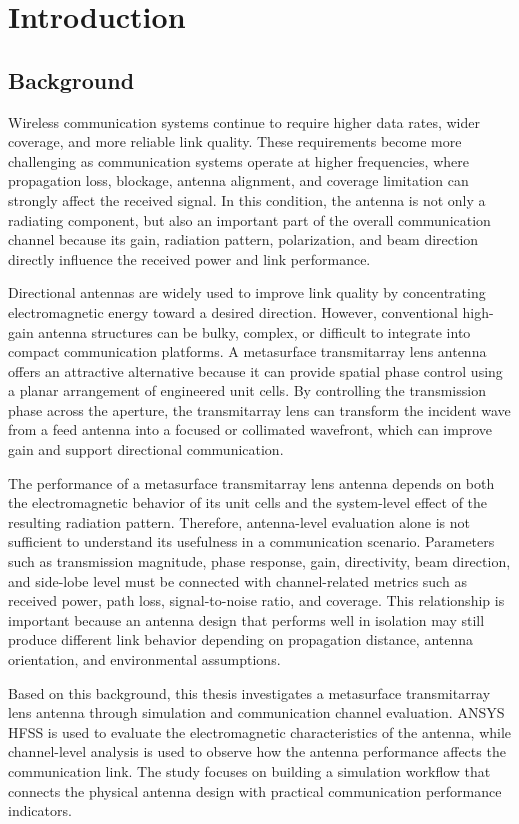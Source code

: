 \chapter{Introduction}

\section{Background}
Wireless communication systems continue to require higher data rates, wider coverage, and more reliable link quality. These requirements become more challenging as communication systems operate at higher frequencies, where propagation loss, blockage, antenna alignment, and coverage limitation can strongly affect the received signal. In this condition, the antenna is not only a radiating component, but also an important part of the overall communication channel because its gain, radiation pattern, polarization, and beam direction directly influence the received power and link performance.

Directional antennas are widely used to improve link quality by concentrating electromagnetic energy toward a desired direction. However, conventional high-gain antenna structures can be bulky, complex, or difficult to integrate into compact communication platforms. A metasurface transmitarray lens antenna offers an attractive alternative because it can provide spatial phase control using a planar arrangement of engineered unit cells. By controlling the transmission phase across the aperture, the transmitarray lens can transform the incident wave from a feed antenna into a focused or collimated wavefront, which can improve gain and support directional communication.

The performance of a metasurface transmitarray lens antenna depends on both the electromagnetic behavior of its unit cells and the system-level effect of the resulting radiation pattern. Therefore, antenna-level evaluation alone is not sufficient to understand its usefulness in a communication scenario. Parameters such as transmission magnitude, phase response, gain, directivity, beam direction, and side-lobe level must be connected with channel-related metrics such as received power, path loss, signal-to-noise ratio, and coverage. This relationship is important because an antenna design that performs well in isolation may still produce different link behavior depending on propagation distance, antenna orientation, and environmental assumptions.

Based on this background, this thesis investigates a metasurface transmitarray lens antenna through simulation and communication channel evaluation. ANSYS HFSS is used to evaluate the electromagnetic characteristics of the antenna, while channel-level analysis is used to observe how the antenna performance affects the communication link. The study focuses on building a simulation workflow that connects the physical antenna design with practical communication performance indicators.

